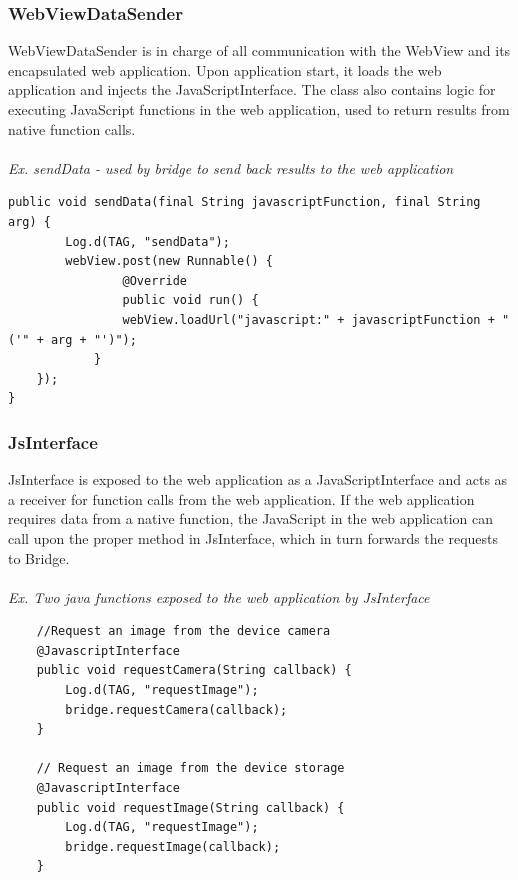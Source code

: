 \subsubsection{WebViewDataSender}
WebViewDataSender is in charge of all communication with the WebView and its encapsulated web application. Upon application start, it loads the web application and injects the JavaScriptInterface. The class also contains logic for executing JavaScript functions in the web application, used to return results from native function calls.
\\\\
\emph{Ex. sendData - used by bridge to send back results to the web application}
\begin{lstlisting}
public void sendData(final String javascriptFunction, final String arg) {
        Log.d(TAG, "sendData");
        webView.post(new Runnable() {
            	@Override
            	public void run() {
        		webView.loadUrl("javascript:" + javascriptFunction + "('" + arg + "')");
    		}
	});
}
\end{lstlisting}
	
\subsubsection{JsInterface} \label{subsubsec:jsinterface}
JsInterface is exposed to the web application as a JavaScriptInterface and acts as a receiver for function calls from the web application. If the web application requires data from a native function, the JavaScript in the web application can call upon the proper method in JsInterface, which in turn forwards the requests to Bridge.
\\\\
\emph{Ex. Two java functions exposed to the web application by JsInterface}
\begin{lstlisting}
    //Request an image from the device camera
    @JavascriptInterface
    public void requestCamera(String callback) {
        Log.d(TAG, "requestImage");
        bridge.requestCamera(callback);
    }

    // Request an image from the device storage
    @JavascriptInterface
    public void requestImage(String callback) {
        Log.d(TAG, "requestImage");
        bridge.requestImage(callback);
    }
\end{lstlisting}

	
